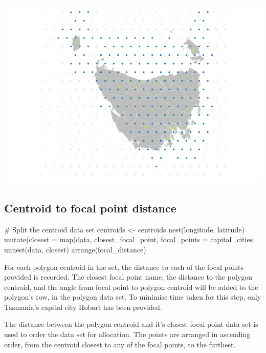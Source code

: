 \begin{Schunk}

\includegraphics{algorithmRjournal_files/figure-latex/filter_grid-1} \end{Schunk}

\hypertarget{centroid-to-focal-point-distance}{%
\subsection{Centroid to focal point
distance}\label{centroid-to-focal-point-distance}}

\begin{Schunk}
\begin{Sinput}
# Split the centroid data set
centroids <- centroids %
  nest(longitude, latitude) %
  mutate(closest = map(data, closest_focal_point, focal_points = capital_cities %
  unnest(data, closest) %
  arrange(focal_distance)
\end{Sinput}
\end{Schunk}

For each polygon centroid in the set, the distance to each of the focal
points provided is recorded. The closest focal point name, the distance
to the polygon centroid, and the angle from focal point to polygon
centroid will be added to the polygon's row, in the polygon data set. To
minimise time taken for this step, only Tasmania's capital city Hobart
has been provided.

The distance between the polygon centroid and it's closest focal point
data set is used to order the data set for allocation. The points are
arranged in ascending order, from the centroid closest to any of the
focal points, to the furthest.

